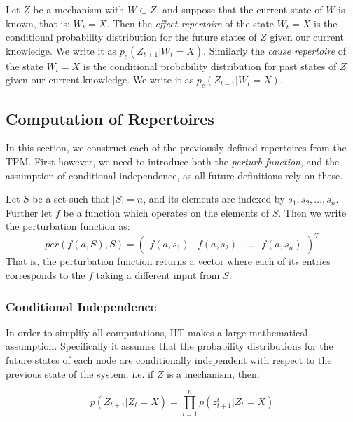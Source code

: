 \begin{definition}
	{Let $Z$ be a mechanism with $W\subset Z$, and suppose that the current state of $W$ is known, that is: $W_t = X$. Then the \textit{effect repertoire} of the state $W_t = X$ is the conditional probability distribution for the future states of $Z$ given our current knowledge. We write it as $p_e(Z_{t+1}|W_t=X)$. Similarly the \textit{cause repertoire} of the state $W_t = X$ is the conditional probability distribution for past states of $Z$ given our current knowledge. We write it as $p_c(Z_{t-1}|W_t = X)$.}
\end{definition}


\subsection{Computation of Repertoires}
In this section, we construct each of the previously defined repertoires from the TPM. First however, we need to introduce both the \textit{perturb function}, and the assumption of conditional independence, as all future definitions rely on these.

\begin{definition}
	{Let $S$ be a set such that $|S| = n$, and its elements are indexed by $s_1, s_2, \ldots, s_n$. Further let $f$ be a function which operates on the elements of $S$. Then we write the perturbation function as:
	\[per(f(a, S), S) = \left(\begin{array}{cccc}f(a,s_1)&f(a,s_2)&\ldots&f(a,s_n) \end{array}\right)^T\]
	That is, the perturbation function returns a vector where each of its entries corresponds to the $f$ taking a different input from $S$.}
\end{definition} 

\subsubsection{Conditional Independence}
\label{sec:conditional_independence}
In order to simplify all computations, IIT makes a large mathematical assumption. Specifically it assumes that the probability distributions for the future states of each node are conditionally independent with respect to the previous state of the system. i.e. if $Z$ is a mechanism, then:

\begin{equation}
\label{eq:cond_independence}
p(Z_{t+1}|Z_t = X) = \prod \limits_{i=1}^{n} p(z^i_{t+1}|Z_t=X)
\end{equation}


